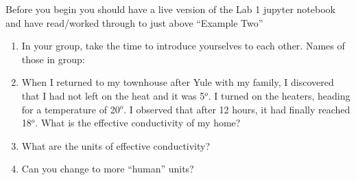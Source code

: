 \documentclass[12pt]{article}
\begin{document}
Before you begin you should have a live version of the Lab 1 jupyter notebook and have read/worked through to just above ``Example Two''

\begin{enumerate}
\item In your group, take the time to introduce yourselves to each other.  Names of those in group:

\vspace{2in}

\item When I returned to my townhouse after Yule with my family, I discovered that I had not left on the heat and it was 5$^o$.  I turned on the heaters, heading for a temperature of 20$^o$.  I observed that after 12 hours, it had finally reached 18$^o$.  What is the effective conductivity of my home?

\vspace{0.5in}

\item What are the units of effective conductivity?

\vspace{0.5in}

\item Can you change to more ``human'' units?

\end{enumerate}
\end{document}
